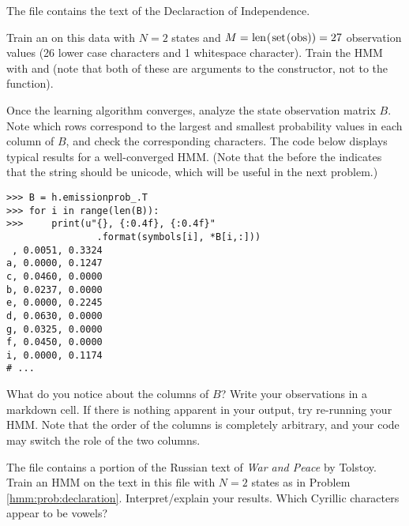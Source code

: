 \begin{problem}\label{hmm:prob:declaration}
The file  contains the text of the Declaraction of Independence.

Train an  on this data with $N=2$ states and $M=\text{\li{len(set(obs))}}=27$ observation values (26 lower case characters and 1 whitespace character).
Train the HMM with  and  (note that both of these are arguments to the constructor, not to the  function).

Once the learning algorithm converges, analyze the state observation matrix $B$.
Note which rows correspond to the largest and smallest probability values in each column of $B$,
and check the corresponding characters.
The code below displays typical results for a well-converged HMM. 
(Note that the  before the  indicates that the string should be unicode, which will be useful in the next problem.)
\begin{lstlisting}
>>> B = h.emissionprob_.T
>>> for i in range(len(B)):
>>>     print(u"{}, {:0.4f}, {:0.4f}"
                .format(symbols[i], *B[i,:]))
 , 0.0051, 0.3324
a, 0.0000, 0.1247
c, 0.0460, 0.0000
b, 0.0237, 0.0000
e, 0.0000, 0.2245
d, 0.0630, 0.0000
g, 0.0325, 0.0000
f, 0.0450, 0.0000
i, 0.0000, 0.1174
# ...
\end{lstlisting}
What do you notice about the columns of $B$?
Write your observations in a markdown cell.
If there is nothing apparent in your output, try re-running your HMM.
Note that the order of the columns is completely arbitrary, and your code may switch the role of the two columns.
\end{problem}

\begin{comment}
\begin{problem}
Repeat the previous calculation with 3 hidden states.
Interpret/explain your results.
Note that as the number of hidden states increases, the divisions of the characters will become more abstract and less interpretable.

With 3 hidden states, you can use the following to display the matrix $B$:
\begin{lstlisting}
print(u"{}, {:0.4f}, {:0.4f}, {:0.4f}"
        .format(symbols[i], *hmm_example.B[i,:]))
\end{lstlisting}
\end{problem}
\end{comment}

\begin{problem}
The file  contains a portion of the Russian text of \textit{War and Peace} by Tolstoy.
Train an HMM on the text in this file with $N=2$ states as in Problem \ref{hmm:prob:declaration}.
Interpret/explain your results.
Which Cyrillic characters appear to be vowels?
\end{problem}
